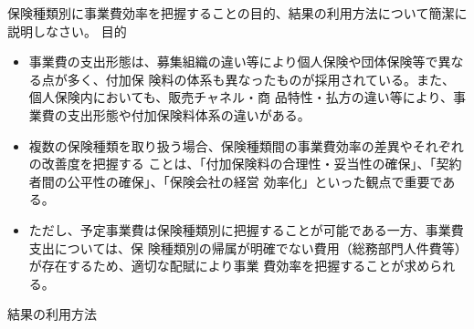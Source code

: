 \documentclass[report,gutter=10mm,fore-edge=10mm,uplatex,dvipdfmx]{jlreq}
\begin{document}
保険種類別に事業費効率を把握することの目的、結果の利用方法について簡潔に説明しなさい。
\answer{}
目的

\begin{itemize}
 \item[] 事業費の支出形態は、募集組織の違い等により個人保険や団体保険等で異なる点が多く、付加保
 険料の体系も異なったものが採用されている。また、個人保険内においても、販売チャネル・商
 品特性・払方の違い等により、事業費の支出形態や付加保険料体系の違いがある。
 \item[] 複数の保険種類を取り扱う場合、保険種類間の事業費効率の差異やそれぞれの改善度を把握する
 ことは、「付加保険料の合理性・妥当性の確保」、「契約者間の公平性の確保」、「保険会社の経営
 効率化」といった観点で重要である。
 \item[] ただし、予定事業費は保険種類別に把握することが可能である一方、事業費支出については、保
 険種類別の帰属が明確でない費用（総務部門人件費等）が存在するため、適切な配賦により事業
 費効率を把握することが求められる。
\end{itemize}
結果の利用方法
\end{document}
